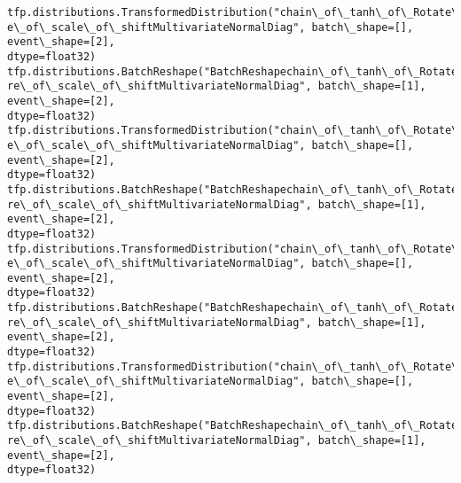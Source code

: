 \documentclass[11pt]{article}
\begin{document}
    \begin{Verbatim}[commandchars=\\\{\}]
tfp.distributions.TransformedDistribution("chain\_of\_tanh\_of\_Rotate\_of\_ScaleSquar
e\_of\_scale\_of\_shiftMultivariateNormalDiag", batch\_shape=[], event\_shape=[2],
dtype=float32)
tfp.distributions.BatchReshape("BatchReshapechain\_of\_tanh\_of\_Rotate\_of\_ScaleSqua
re\_of\_scale\_of\_shiftMultivariateNormalDiag", batch\_shape=[1], event\_shape=[2],
dtype=float32)
tfp.distributions.TransformedDistribution("chain\_of\_tanh\_of\_Rotate\_of\_ScaleSquar
e\_of\_scale\_of\_shiftMultivariateNormalDiag", batch\_shape=[], event\_shape=[2],
dtype=float32)
tfp.distributions.BatchReshape("BatchReshapechain\_of\_tanh\_of\_Rotate\_of\_ScaleSqua
re\_of\_scale\_of\_shiftMultivariateNormalDiag", batch\_shape=[1], event\_shape=[2],
dtype=float32)
tfp.distributions.TransformedDistribution("chain\_of\_tanh\_of\_Rotate\_of\_ScaleSquar
e\_of\_scale\_of\_shiftMultivariateNormalDiag", batch\_shape=[], event\_shape=[2],
dtype=float32)
tfp.distributions.BatchReshape("BatchReshapechain\_of\_tanh\_of\_Rotate\_of\_ScaleSqua
re\_of\_scale\_of\_shiftMultivariateNormalDiag", batch\_shape=[1], event\_shape=[2],
dtype=float32)
tfp.distributions.TransformedDistribution("chain\_of\_tanh\_of\_Rotate\_of\_ScaleSquar
e\_of\_scale\_of\_shiftMultivariateNormalDiag", batch\_shape=[], event\_shape=[2],
dtype=float32)
tfp.distributions.BatchReshape("BatchReshapechain\_of\_tanh\_of\_Rotate\_of\_ScaleSqua
re\_of\_scale\_of\_shiftMultivariateNormalDiag", batch\_shape=[1], event\_shape=[2],
dtype=float32)
\end{Verbatim}

    \begin{center}
    \end{center}
    { \hspace*{\fill} \\}
    
\end{document}
